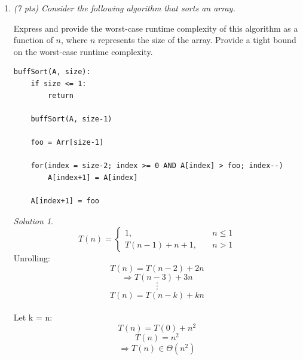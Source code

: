 \documentclass[12pt]{article}
\theoremstyle{remark}
\newtheorem*{solution}{Solution}
\newcommand{\makenonemptybox}[2]{%
\item[]
\fbox{%
\parbox[c][#1][t]{\dimexpr\linewidth-2\fboxsep-2\fboxrule}{
  \hrule width \hsize height 0pt
  #2
 }%
}%
\par\vspace{\ht\strutbox}
}
\begin{document}
\begin{enumerate}



\pagebreak
\item {\itshape (7 pts) Consider the following algorithm that sorts an array.

\noindent Express and provide the worst-case runtime complexity of this algorithm as a function of $n$, where $n$ represents the size of the array. Provide a tight bound on the worst-case runtime complexity.
}
\begin{verbatim}
buffSort(A, size):
    if size <= 1:
        return
    
    buffSort(A, size-1)
    
    foo = Arr[size-1]
    
    for(index = size-2; index >= 0 AND A[index] > foo; index--)
        A[index+1] = A[index]
    
    A[index+1] = foo
\end{verbatim}
\begin{solution}
$$
T(n) = \left\{
        \begin{array}{ll}
            1, & \quad n \leq 1 \\
            T(n-1)+n+1, & \quad n > 1
        \end{array}
    \right.
$$
Unrolling: $$T(n) = T(n-2) + 2n$$ $$\Rightarrow T(n-3) + 3n$$ $$\cdot$$ $$\cdot$$ $$\cdot$$ $$T(n) = T(n-k) + kn$$ \\Let k = n: $$T(n) = T(0) + n^2$$ $$T(n) = n^2$$ $$\Rightarrow T(n) \in \Theta(n^2)$$
\end{solution}

\end{enumerate}
\end{document}
